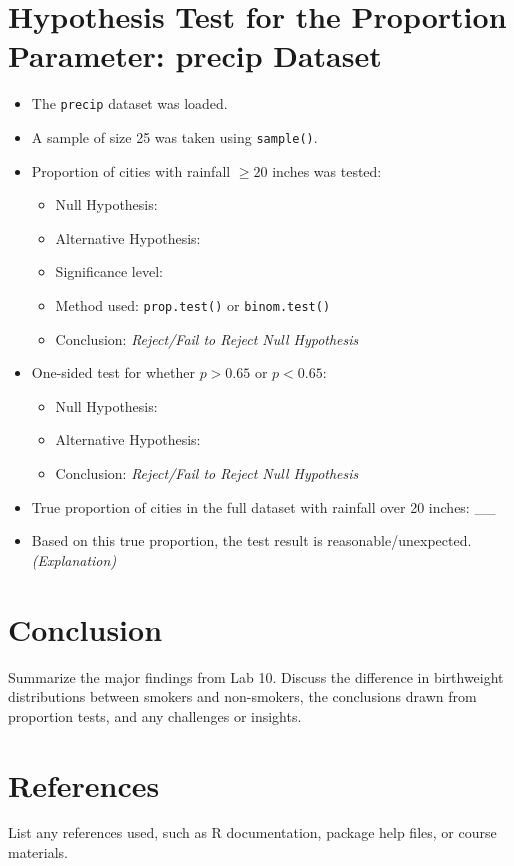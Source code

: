 \documentclass{article}
\begin{document}
\section{Hypothesis Test for the Proportion Parameter: precip Dataset}
\begin{itemize}
    \item The \texttt{precip} dataset was loaded.
    \item A sample of size 25 was taken using \texttt{sample()}.
    \item Proportion of cities with rainfall \(\geq 20\) inches was tested:
    \begin{itemize}
        \item Null Hypothesis: 
        \item Alternative Hypothesis: 
        \item Significance level: 
        \item Method used: \texttt{prop.test()} or \texttt{binom.test()}
        \item Conclusion: \textit{Reject/Fail to Reject Null Hypothesis}
    \end{itemize}
    \item One-sided test for whether \(p > 0.65\) or \(p < 0.65\):
    \begin{itemize}
        \item Null Hypothesis: 
        \item Alternative Hypothesis: 
        \item Conclusion: \textit{Reject/Fail to Reject Null Hypothesis}
    \end{itemize}
    \item True proportion of cities in the full dataset with rainfall over 20 inches: \_\_
    \item Based on this true proportion, the test result is reasonable/unexpected. \textit{(Explanation)}
\end{itemize}

\section{Conclusion}
Summarize the major findings from Lab 10. Discuss the difference in birthweight distributions between smokers and non-smokers, the conclusions drawn from proportion tests, and any challenges or insights.

\section{References}
List any references used, such as R documentation, package help files, or course materials.
\end{document}

